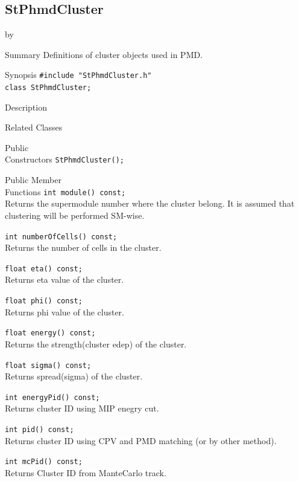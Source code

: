 \documentclass[twoside]{article}
\newcommand{\entrylabel}[1]{\mbox{\textbf{{#1}}}\hfil}%
\newenvironment{entry}
{\begin{list}{}%
    {\renewcommand{\makelabel}{\entrylabel}%
     \setlength{\labelwidth}{90pt}%
     \setlength{\leftmargin}{\labelwidth}
     \advance\leftmargin by \labelsep%
      }%
    }%
  {\end{list}}
\newcommand{\Entrylabel}[1]%
{\raisebox{0pt}[1ex][0pt]{\makebox[\labelwidth][l]%
    {\parbox[t]{\labelwidth}{\hspace{0pt}\textbf{{#1}}}}}}
\newenvironment{Entry}%
{\renewcommand{\entrylabel}{\Entrylabel}\begin{entry}}%
  {\end{entry}}
\begin{document}
\subsection{StPhmdCluster}
\label{sec:StPhmdCluster}
\begin{Entry}
\item[Summary]
 Definitions of cluster objects used in PMD.

\item[Synopsis]
    \verb+#include "StPhmdCluster.h"+\\ \verb+class StPhmdCluster;+\\
\item[Description]
\item[Related Classes]
\item[Public\\ Constructors]
    \verb+StPhmdCluster();+\\
\item[Public Member\\ Functions]
    \verb+int module() const;+\\
     Returns the supermodule number where the cluster belong. It is assumed that clustering will be performed SM-wise.

    \verb+int numberOfCells() const;+\\
     Returns the number of cells in the cluster.

    \verb+float eta() const;+\\
     Returns eta value of the cluster.

    \verb+float phi() const;+\\
     Returns phi value of the cluster.

    \verb+float energy() const;+\\
     Returns the strength(cluster edep) of the cluster.

    \verb+float sigma() const;+\\
     Returns spread(sigma) of the cluster.

    \verb+int energyPid() const;+\\
     Returns cluster ID using MIP enegry cut.

    \verb+int pid() const;+\\
     Returns cluster ID using CPV and PMD matching (or by other method).

    \verb+int mcPid() const;+\\
     Returns Cluster ID from ManteCarlo track.


\end{Entry}
\end{document}
